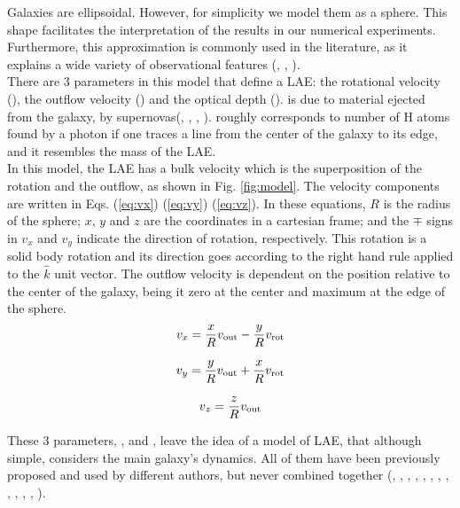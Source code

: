 \documentclass[twocolappendix]{latex/emulateapj}
\begin{document}
Galaxies are ellipsoidal. However, for simplicity we model them as a sphere. This shape facilitates the interpretation of the results in our numerical experiments. Furthermore, this approximation is commonly used in the literature, as it explains a wide variety of observational features (\cite{Ahn03}, \cite{Verhamme06}, \cite{Dijkstra06}). \\

There are 3 parameters in this model that define a LAE: the rotational velocity (\vrot), the outflow velocity (\vout) and the optical depth (\tauh). \vout is due to material ejected from the galaxy, by supernovas(\cite{Verhamme06}, \cite{Orsi12}, \cite{Hashimoto2015}, \cite{Gronke2015}). \tauh roughly corresponds to number of H atoms found by a \lya photon if one traces a line from the center of the galaxy to its edge, and it resembles the mass of the LAE.\\

In this model, the LAE has a bulk velocity which is the superposition of the rotation and the outflow, as shown in Fig. \ref{fig:model}. The velocity components are written in Eqs. (\ref{eq:vx}) (\ref{eq:vy}) (\ref{eq:vz}). In these equations, $R$ is the radius of the sphere; $x$, $y$ and $z$ are the coordinates in a cartesian frame; and the $\mp$ signs in $v_x$ and $v_y$ indicate the direction of rotation, respectively. This rotation is a solid body rotation and its direction goes according to the right hand rule applied to the $\hat{k}$ unit vector. The outflow velocity is dependent on the position relative to the center of the galaxy, being it zero at the center and maximum at the edge of the sphere.\\

\begin{equation}
	v_{x}=\frac{x}{R}v_{\rm out}-\frac{y}{R}v_{\rm rot} 
	\label{eq:vx}
\end{equation}

\begin{equation}
	v_{y}=\frac{y}{R}v_{\rm out}+\frac{x}{R}v_{\rm rot} 
	\label{eq:vy}
\end{equation}

\begin{equation}
	v_{z}=\frac{z}{R}v_{\rm out}
	\label{eq:vz}
\end{equation}

These 3 parameters, \vrot, \vout and \tauh, leave the idea of a model of LAE, that although simple, considers the main galaxy's dynamics. All of them have been previously proposed and used by different authors, but never combined together (\cite{Adams72}, \cite{Harrington73}, \cite{Neufeld90}, \cite{Dijkstra06}, \cite{Verhamme06}, \cite{Forero12}, \cite{Martin2015}, \cite{Garavito14}, \cite{Neufeld91}, \cite{Laursen09}, \cite{Barnes11}, \cite{Verhamme12}, \cite{Yajima12}).\\
\end{document}
